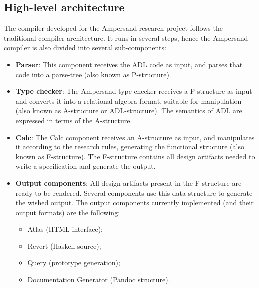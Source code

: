 
\subsection{High-level architecture}
\label{subsec:architecture}
The compiler developed for the Ampersand research project follows the traditional compiler architecture.
It runs in several steps, hence the Ampersand compiler is also divided into several sub-components:
%
%
%
%
\begin{itemize}
	\item \textbf{Parser}: This component receives the ADL code as input, and parses that code into a parse-tree (also known as P-structure).
	\item \textbf{Type checker}: The Ampersand type checker receives a P-structure as input and converts it into a relational algebra format, suitable for manipulation (also known as A-structure or ADL-structure).
		 The semantics of ADL are expressed in terms of the A-structure.
	\item \textbf{Calc}: The Calc component receives an A-structure as input, and manipulates it according to the research rules, generating the functional structure (also known as F-structure).
		The F-structure contains all design artifacts needed to write a specification and generate the output.
	\item \textbf{Output components}: All design artifacts present in the F-structure are ready to be rendered.
		Several components use this data structure to generate the wished output.
		The output components currently implemented (and their output formats) are the following: 
		\begin{itemize}
			\item Atlas (HTML interface);
			\item Revert (Haskell source);
			\item Query (prototype generation);
			\item Documentation Generator (Pandoc structure).
		\end{itemize}
\end{itemize}
